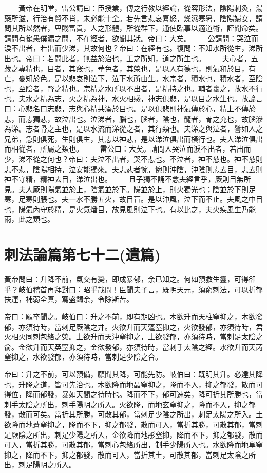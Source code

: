 　　黃帝在明堂，雷公請曰：臣授業，傳之行教以經論，從容形法，陰陽刺灸，湯藥所滋，行治有賢不肖，未必能十全。若先言悲哀喜怒，燥濕寒暑，陰陽婦女，請問其所以然者，卑賤富貴，人之形體，所從群下，通使臨事以適道術，謹聞命矣。請問有毚愚僕漏之問，不在經者，欲聞其狀。帝曰：大矣。
　　公請問：哭泣而淚不出者，若出而少涕，其故何也？帝曰：在經有也。復問：不知水所從生，涕所出也。帝曰：若問此者，無益於治也，工之所知，道之所生也。
　　夫心者，五藏之專精也，目者，其竅也，華色者，其榮也，是以人有德也，則氣和於目，有亡，憂知於色。是以悲哀則泣下，泣下水所由生。水宗者，積水也，積水者，至陰也，至陰者，腎之精也。宗精之水所以不出者，是精持之也。輔者裹之，故水不行也。夫水之精為志，火之精為神，水火相感，神志俱悲，是以目之水生也。故諺言曰：心悲名曰志悲，志與心精共湊於目也。是以俱悲則神氣傳於心，精上不傳於志，而志獨悲，故泣出也。泣涕者，腦也，腦者，陰也，髓者，骨之充也，故腦滲為涕。志者骨之主也，是以水流而涕從之者，其行類也。夫涕之與泣者，譬如人之兄弟，急則俱死，生則俱生，其志以神悲，是以涕泣俱出而橫行也。夫人涕泣俱出而相從者，所屬之類也。
　　雷公曰：大矣。請問人哭泣而淚不出者，若出而少，涕不從之何也？帝曰：夫泣不出者，哭不悲也。不泣者，神不慈也。神不慈則志不悲，陰陽相持，泣安能獨來。夫志悲者惋，惋則沖陰，沖陰則志去目，志去則神不守精，精神去目，涕泣出也。
　　且子獨不誦不念夫經言乎，厥則目無所見。夫人厥則陽氣並於上，陰氣並於下。陽並於上，則火獨光也；陰並於下則足寒，足寒則脹也。夫一水不勝五火，故目盲。是以沖風，泣下而不止。夫風之中目也，陽氣內守於精，是火氣燔目，故見風則泣下也。有以比之，夫火疾風生乃能雨，此之類也。




\section{刺法論篇第七十二(遺篇)}

黃帝問曰：升降不前，氣交有變，即成暴郁，余已知之。何如預救生靈，可得卻乎？岐伯稽首再拜對曰：昭乎哉問！臣聞夫子言，既明天元，須窮刺法，可以折郁扶運，補弱全真，寫盛蠲余，令除斯苦。

帝曰：願卒聞之。岐伯曰：升之不前，即有期凶也。木欲升而天柱窒抑之，木欲發郁，亦須待時，當刺足厥陰之井。火欲升而天蓬窒抑之，火欲發郁，亦須待時，君火相火同刺包絡之熒。土欲升而天沖窒抑之，土欲發郁，亦須待時，當刺足太陰之俞。金欲升而天英窒抑之，金欲發郁，亦須待時，當刺手太陰之經。水欲升而天芮窒抑之，水欲發郁，亦須待時，當刺足少陰之合。

帝曰：升之不前，可以預備，願聞其降，可能先防。岐伯曰：既明其升。必達其降也，升降之道，皆可先治也。木欲降而地晶窒抑之，降而不入，抑之郁發，散而可得位，降而郁發，暴如天間之待時也。降而不下，郁可速矣，降可折其所勝也，當刺手太陰之所出，刺手陽明之所入。火欲降，而地玄窒抑之，降而不入，抑之郁發，散而可矣。當折其所勝，可散其郁，當刺足少陰之所出，刺足太陽之所入。土欲降而地蒼窒抑之，降而不下，抑之郁發，散而可入，當折其勝，可散其郁，當刺足厥陰之所出，刺足少陽之所入，金欲降而地彤窒抑，降而不下，抑之郁發，散而可入，當折其勝，可散其郁，當刺心包絡所出，制手少陽所入也。水欲降而地阜窒抑之，降而不下，抑之郁發，散而可入，當折其土，可散其郁，當刺足太陰之所出，刺足陽明之所入。


